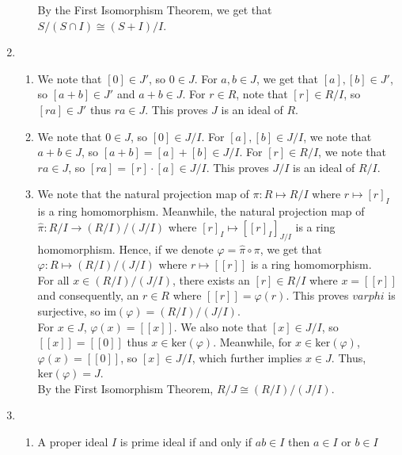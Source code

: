 \documentclass{article}
\begin{document}
\begin{enumerate}
\begin{enumerate}
    By the First Isomorphism Theorem, we get that $S / (S \cap I) \cong (S + I)/I$. 

\end{enumerate}

\newpage

\item
\begin{enumerate}
    \item 
    We note that $[0] \in J'$, so $0 \in J$. For $a, b \in J$, we get that $[a], [b] \in J'$, so $[a + b] \in J'$ and $a + b \in J$. For $r \in R$, note that $[r] \in R/I$, so $[ra] \in J'$ thus $ra \in J$. This proves $J$ is an ideal of $R$. \\

    \item 
    We note that $0 \in J$, so $[0] \in J/I$. For $[a], [b] \in J/I$, we note that $a + b \in J$, so $[a + b] = [a] + [b] \in J/I$. For $[r] \in R/I$, we note that $ra \in J$, so $[ra] = [r] \cdot [a] \in J/I$. This proves $J/I$ is an ideal of $R/I$. \\

    \item
    We note that the natural projection map of $\pi: R \mapsto R/I$ where $r \mapsto [r]_I$ is a ring homomorphism. Meanwhile, the natural projection map of $\hat{\pi}: R/I \rightarrow (R/I)/(J/I)$ where $[r]_I \mapsto [[r]_I]_{J/I}$ is a ring homomorphism. Hence, if we denote $\varphi = \hat{\pi} \circ \pi$, we get that $\varphi: R \mapsto (R/I)/(J/I)$ where $r \mapsto [[r]]$ is a ring homomorphism. \\

    For all $x \in (R/I)/(J/I)$, there exists an $[r] \in R/I$ where $x = [[r]]$ and consequently, an $r \in R$ where $[[r]] = \varphi(r)$. This proves $varphi$ is surjective, so $\text{im}{(\varphi)} = (R/I)/(J/I)$. \\

    For $x \in J$, $\varphi(x) = [[x]]$. We also note that $[x] \in J/I$, so $[[x]] = [[0]]$ thus $x \in \text{ker}(\varphi)$. Meanwhile, for $x \in \text{ker}(\varphi)$, $\varphi(x) = [[0]]$, so $[x] \in J/I$, which further implies $x \in J$. Thus, $\text{ker}(\varphi) = J$. \\

    By the First Isomorphism Theorem, $R/J \cong (R/I) / (J/I)$. 

\end{enumerate}

\newpage 

\item
\begin{enumerate}
    \item 
    A proper ideal $I$ is prime ideal if and only if $ab \in I$ then $a \in I$ or $b \in I$\\


\end{enumerate}
\end{enumerate}
\end{document}
